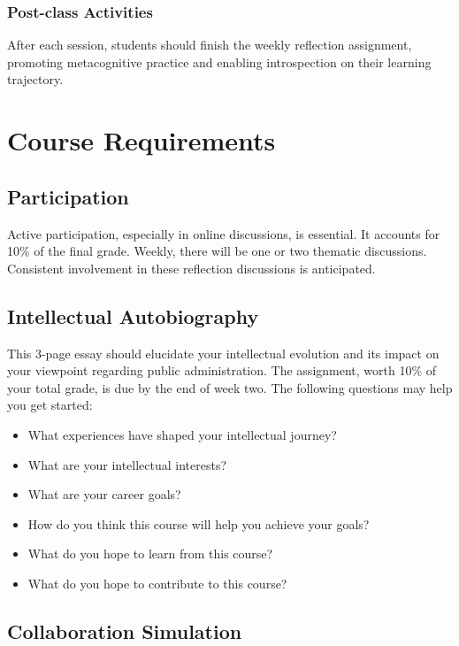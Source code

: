 \documentclass[12pt, letterpaper]{article}
\begin{document}
\subsubsection*{Post-class Activities}

After each session, students should finish the weekly reflection assignment, promoting metacognitive practice and enabling introspection on their learning trajectory.

\section{Course Requirements}

\subsection{Participation}

Active participation, especially in online discussions, is essential. It accounts for 10\% of the final grade. Weekly, there will be one or two thematic discussions. Consistent involvement in these reflection discussions is anticipated.

\subsection{Intellectual Autobiography}

This 3-page essay should elucidate your intellectual evolution and its impact on your viewpoint regarding public administration. The assignment, worth 10\% of your total grade, is due by the end of week two. The following questions may help you get started:
    \begin{itemize}
        \item What experiences have shaped your intellectual journey?
        \item What are your intellectual interests?
        \item What are your career goals?
        \item How do you think this course will help you achieve your goals?
        \item What do you hope to learn from this course?
        \item What do you hope to contribute to this course?
    \end{itemize}
 

\subsection{Collaboration Simulation}
\end{document}
